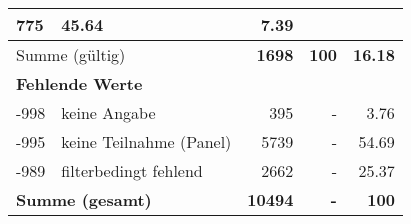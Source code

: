 \begin{longtable}{lXrrr}
       \num{775} &
       \num[round-mode=places,round-precision=2]{45,64} &
         \num[round-mode=places,round-precision=2]{7,39} \\
     \midrule
     \multicolumn{2}{l}{Summe (gültig)} &
       \textbf{\num{1698}} &
     \textbf{100} &
       \textbf{\num[round-mode=places,round-precision=2]{16,18}} \\
     \multicolumn{5}{l}{\textbf{Fehlende Werte}}\\
       -998 &
       keine Angabe &
         \num{395} &
        - &
         \num[round-mode=places,round-precision=2]{3,76} \\
       -995 &
       keine Teilnahme (Panel) &
         \num{5739} &
        - &
         \num[round-mode=places,round-precision=2]{54,69} \\
       -989 &
       filterbedingt fehlend &
         \num{2662} &
        - &
         \num[round-mode=places,round-precision=2]{25,37} \\
     \midrule
     \multicolumn{2}{l}{\textbf{Summe (gesamt)}} &
          \textbf{\num{10494}} &
        \textbf{-} &
        \textbf{100} \\
     \bottomrule
     \end{longtable}
     
